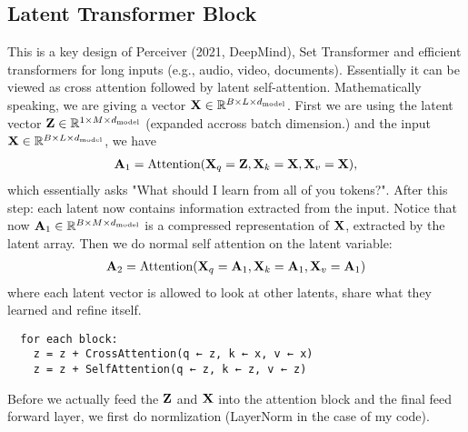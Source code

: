 \documentclass[11pt]{article}  %
\begin{document}
\subsection{Latent Transformer Block}
This is a key design of Perceiver (2021, DeepMind), Set Transformer and efficient transformers for long inputs (e.g., audio, video, documents).
Essentially it can be viewed as cross attention followed by latent self-attention.
Mathematically speaking, we are giving a vector $\mathbf{X} \in \mathbb{R}^{B \times L \times d_{\text{model}}}$. 
First we are using the latent vector $\mathbf{Z} \in \mathbb{R}^{1 \times M \times d_{\text{model}}}$ (expanded accross batch dimension.) and the input $\mathbf{X} \in \mathbb{R}^{B \times L \times d_{\text{model}}}$, we have 
\begin{align*}
  \mathbf{A}_1 = \text{Attention}(\mathbf{X}_q = \mathbf{Z}, \mathbf{X}_k = \mathbf{X}, \mathbf{X}_v = \mathbf{X}),
\end{align*}
which essentially asks "What should I learn from all of you tokens?".
After this step: each latent now contains information extracted from the input.
Notice that now $\mathbf{A}_1 \in \mathbb{R}^{B \times M \times d_{\text{model}}}$ is a compressed representation of $\mathbf{X}$, extracted by the latent array.
Then we do normal self attention on the latent variable:
\begin{align*}
  \mathbf{A}_2 = \text{Attention}(\mathbf{X}_q = \mathbf{A}_1, \mathbf{X}_k = \mathbf{A}_1, \mathbf{X}_v = \mathbf{A}_1)
\end{align*}
where each latent vector is allowed to look at other latents, share what they learned and refine itself.
\begin{verbatim}
  for each block:
    z = z + CrossAttention(q ← z, k ← x, v ← x)
    z = z + SelfAttention(q ← z, k ← z, v ← z)    
\end{verbatim}
Before we actually feed the $\mathbf{Z}$ and $\mathbf{X}$ into the attention block and the final feed forward layer, we first do normlization (LayerNorm in the case of my code).
\end{document}
